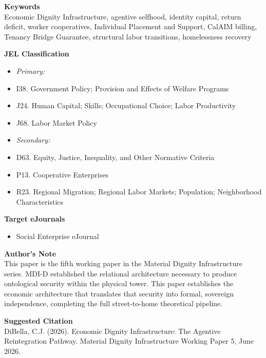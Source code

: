\documentclass[12pt, letterpaper]{article}
\begin{document}
\noindent\textbf{Keywords}\\[1pt]
Economic Dignity Infrastructure, agentive selfhood, identity capital, return deficit, worker cooperatives, Individual Placement and Support, CalAIM billing, Tenancy Bridge Guarantee, structural labor transitions, homelessness recovery

\vspace{8pt}
\noindent\textbf{JEL Classification}
\begin{itemize}[nosep, before={\vspace{-8pt}}, leftmargin=2em]
    \item[] \textit{Primary:}
    \item I38. Government Policy; Provision and Effects of Welfare Programs
    \item J24. Human Capital; Skills; Occupational Choice; Labor Productivity
    \item J68. Labor Market Policy
    \item[] \textit{Secondary:}
    \item D63. Equity, Justice, Inequality, and Other Normative Criteria
    \item P13. Cooperative Enterprises
    \item R23. Regional Migration; Regional Labor Markets; Population; Neighborhood Characteristics
\end{itemize}

\vspace{8pt}
\noindent\textbf{Target eJournals}
\begin{itemize}[nosep, before={\vspace{-8pt}}, leftmargin=2em]
    \item Social Enterprise eJournal
\end{itemize}

\vspace{8pt}
\noindent\textbf{Author's Note}\\[1pt]
This paper is the fifth working paper in the Material Dignity Infrastructure series. MDI-D established the relational architecture necessary to produce ontological security within the physical tower. This paper establishes the economic architecture that translates that security into formal, sovereign independence, completing the full street-to-home theoretical pipeline.

\vspace{8pt}
\noindent\textbf{Suggested Citation}\\[1pt]
DiBella, C.J. (2026). Economic Dignity Infrastructure: The Agentive Reintegration Pathway. Material Dignity Infrastructure Working Paper 5, June 2026.
\end{document}
